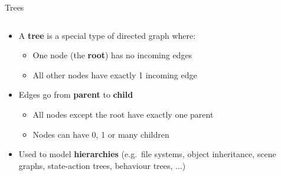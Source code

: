 \begin{frame}{Trees}
\begin{columns}
		\begin{column}{0.68\textwidth}
			\begin{itemize}
				\pause\item A \textbf{tree} is a special type of directed graph where:
					\begin{itemize}
						\pause\item One node (the \textbf{root}) has no incoming edges
						\pause\item All other nodes have exactly 1 incoming edge
					\end{itemize}
				\pause\item Edges go from \textbf{parent} to \textbf{child}
					\begin{itemize}
						\pause\item All nodes except the root have exactly one parent
						\pause\item Nodes can have 0, 1 or many children
					\end{itemize}
				\pause\item Used to model \textbf{hierarchies} (e.g.\ file systems, object inheritance, scene graphs, state-action trees, behaviour trees, ...)
			\end{itemize}
		\end{column}
	\end{columns}
\end{frame}
